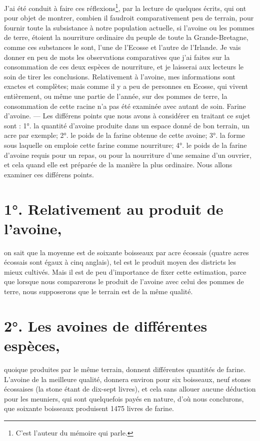 \setcounter{page}{352} J'ai été conduit à faire ces réflexions\footnote{C'est l'auteur du mémoire qui parle.}, par la lecture de quelques écrits, qui ont pour objet de montrer, combien il faudroit comparativement peu de terrain, pour fournir toute la subsistance à notre population actuelle, si l'avoine ou les pommes de terre, étoient la nourriture ordinaire du peuple de toute la Grande-Bretagne, comme ces substances le sont, l'une de l'Ecosse et l'autre de l'Irlande. Je vais donner en peu de mots les observations comparatives que j'ai faites sur la consommation de ces deux espèces de nourriture, et je laisserai aux lecteurs le soin de tirer les conclusions. Relativement à l'avoine, mes informations sont exactes et complètes; mais comme il y a peu de personnes en Ecosse, qui vivent entièrement, ou même une partie de l'année, sur des pommes de terre, la consommation de cette racine n'a pas été examinée avec autant de soin. Farine d'avoine. — Les différens points que nous avons à considérer en traitant ce sujet sont : 1°. la quantité d'avoine produite dans un espace donné de bon terrain, un acre par exemple; 2°. le poids de la farine obtenue de cette avoine; 3°. la forme sous laquelle on emploie cette farine comme nourriture; 4°. le poids de la farine d'avoine requis\setcounter{page}{353} pour un repas, ou pour la nourriture d'une semaine d'un ouvrier, et cela quand elle est préparée de la manière la plus ordinaire. Nous allons examiner ces différens points.
\section{1°. Relativement au produit de l'avoine,} on sait que la moyenne est de soixante boisseaux par acre écossais (quatre acres écossais sont égaux à cinq anglais), tel est le produit moyen des districts les mieux cultivés. Mais il est de peu d'importance de fixer cette estimation, parce que lorsque nous comparerons le produit de l'avoine avec celui des pommes de terre, nous supposerons que le terrain est de la même qualité.
\section{2°. Les avoines de différentes espèces,} quoique produites par le même terrain, donnent différentes quantités de farine. L'avoine de la meilleure qualité, donnera environ pour six boisseaux, neuf stones écossaises (la stone étant de dix-sept livres), et cela sans allouer aucune déduction pour les meuniers, qui sont quelquefois payés en nature, d'où nous conclurons, que soixante boisseaux produisent 1475 livres de farine.

